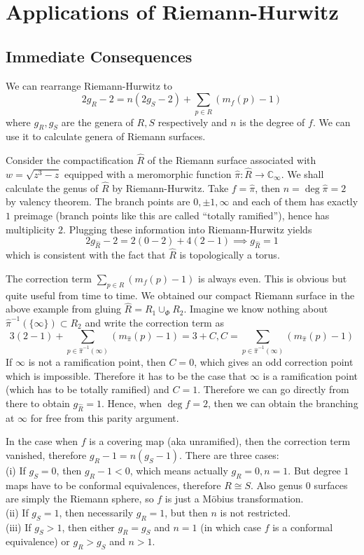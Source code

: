 \section{Applications of Riemann-Hurwitz}
\subsection{Immediate Consequences}
We can rearrange Riemann-Hurwitz to
$$2g_R-2=n(2g_S-2)+\sum_{p\in R}(m_f(p)-1)$$
where $g_R,g_S$ are the genera of $R,S$ respectively and $n$ is the degree of $f$.
We can use it to calculate genera of Riemann surfaces.
\begin{example}
    Consider the compactification $\hat{R}$ of the Riemann surface associated with $w=\sqrt{z^3-z}$ equipped with a meromorphic function $\hat{\pi}:\hat{R}\to\mathbb C_\infty$.
    We shall calculate the genus of $\hat{R}$ by Riemann-Hurwitz.
    Take $f=\hat\pi$, then $n=\deg\hat\pi=2$ by valency theorem.
    The branch points are $0,\pm 1,\infty$ and each of them has exactly $1$ preimage (branch points like this are called ``totally ramified''), hence has multiplicity $2$.
    Plugging these information into Riemann-Hurwitz yields
    $$2g_{\hat{R}}-2=2(0-2)+4(2-1)\implies g_{\hat{R}}=1$$
    which is consistent with the fact that $\hat{R}$ is topologically a torus.
\end{example}
\begin{remark}
    The correction term $\sum_{p\in R}(m_f(p)-1)$ is always even.
    This is obvious but quite useful from time to time.
    We obtained our compact Riemann surface in the above example from gluing $\hat{R}=R_1\cup_\Phi R_2$.
    Imagine we know nothing about $\hat\pi^{-1}(\{\infty\})\subset R_2$ and write the correction term as
    $$3(2-1)+\sum_{p\in\hat\pi^{-1}(\infty)}(m_{\hat\pi}(p)-1)=3+C,C=\sum_{p\in\hat\pi^{-1}(\infty)}(m_{\hat\pi}(p)-1)$$
    If $\infty$ is not a ramification point, then $C=0$, which gives an odd correction point which is impossible.
    Therefore it has to be the case that $\infty$ is a ramification point (which has to be totally ramified) and $C=1$.
    Therefore we can go directly from there to obtain $g_{\hat{R}}=1$.
    Hence, when $\deg f=2$, then we can obtain the branching at $\infty$ for free from this parity argument.
\end{remark}
\begin{remark}
    In the case when $f$ is a covering map (aka unramified), then the correction term vanished, therefore $g_R-1=n(g_S-1)$.
    There are three cases:\\
    (i) If $g_S=0$, then $g_R-1<0$, which means actually $g_R=0,n=1$.
    But degree $1$ maps have to be conformal equivalences, therefore $R\cong S$.
    Also genus $0$ surfaces are simply the Riemann sphere, so $f$ is just a M\"obius transformation.\\
    (ii) If $g_S=1$, then necessarily $g_R=1$, but then $n$ is not restricted.\\
    (iii) If $g_S>1$, then either $g_R=g_S$ and $n=1$ (in which case $f$ is a conformal equivalence) or $g_R>g_S$ and $n>1$.
\end{remark}

